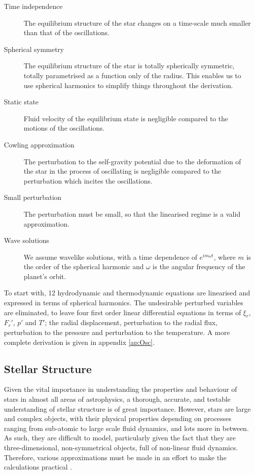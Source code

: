 \documentclass[11pt]{amsart}
\begin{document}
\begin{description}
\item[Time independence]
 The equilibrium structure of the star changes on a time-scale much smaller than that of the oscillations.
 
 \item[Spherical symmetry]
 The equilibrium structure of the star is totally spherically symmetric, totally parametrised as a function only of the radius.  This enables us to use spherical harmonics to simplify things throughout the derivation.
 
 \item[Static state]
 Fluid velocity of the equilibrium state is negligible compared to the motions of the oscillations.
 
 \item[Cowling approximation]
 The perturbation to the self-gravity potential due to the deformation of the star in the process of oscillating is negligible compared to the perturbation which incites the oscillations.
 
 \item[Small perturbation]
 The perturbation must be small, so that the linearised regime is a valid approximation.
 
 \item[Wave solutions]
 We assume wavelike solutions, with a time dependence of $e^{i m \omega t}$, where $m$ is the order of the spherical harmonic and $\omega$ is the angular frequency of the planet's orbit.
\end{description}


To start with, 12 hydrodynamic and thermodynamic equations are linearised and expressed in terms of spherical harmonics. The undesirable perturbed variables are eliminated, to leave four first order linear differential equations in terms of $\xi_{r}$, $F_{r}'$, $p'$ and $T'$; the radial displacement, perturbation to the radial flux, perturbation to the pressure and perturbation to the temperature.  A more complete derivation is given in appendix \ref{ap:Osc}.





\subsection{Stellar Structure} \label{Intro:StellarStruc}

Given the vital importance in understanding the properties and behaviour of stars in almost all areas of astrophysics, a thorough, accurate, and testable understanding of stellar structure is of great importance.  However, stars are large and complex objects, with their physical properties depending on processes ranging from sub-atomic to large scale fluid dynamics, and lots more in between.  As such, they are difficult to model, particularly given the fact that they are three-dimensional, non-symmetrical objects, full of non-linear fluid dynamics.  Therefore, various approximations must be made in an effort to make the calculations practical \cite{Paxton2011}.
\end{document}
